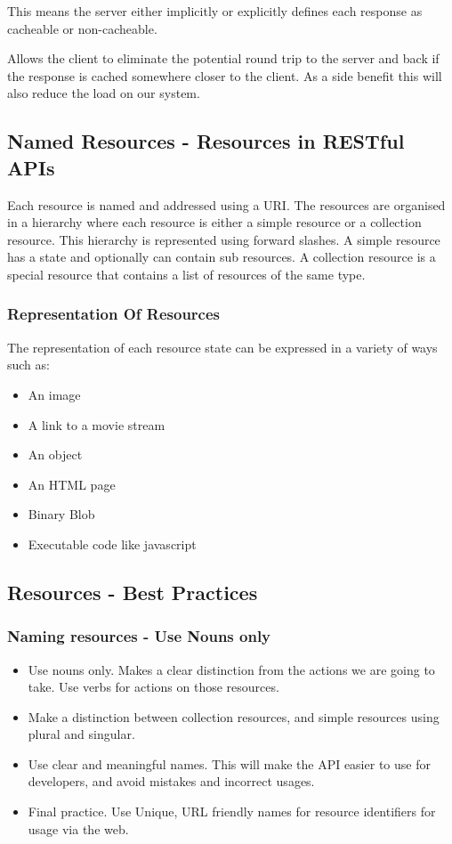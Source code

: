 This means the server either implicitly or explicitly defines each response as cacheable or non-cacheable.


Allows the client to eliminate the potential round trip to the server and back if the response is cached somewhere closer to the client.
As a side benefit this will also reduce the load on our system.

\subsection{Named Resources - Resources in RESTful APIs}

Each resource is named and addressed using a URI.
The resources are organised in a hierarchy where each resource is either a simple resource or a collection resource.
This hierarchy is represented using forward slashes.
A simple resource has a state and optionally can contain sub resources.
A collection resource is a special resource that contains a list of resources of the same type.

\subsubsection{Representation Of Resources}
The representation of each resource state can be expressed in a variety of ways such as:
\begin{itemize}
    \item An image
    \item A link to a movie stream
    \item An object
    \item An HTML page
    \item Binary Blob
    \item Executable code like javascript
\end{itemize}

\subsection{Resources - Best Practices}

\subsubsection{Naming resources - Use Nouns only}
\begin{itemize}
    \item Use nouns only. Makes a clear distinction from the actions we are going to take. Use verbs for actions on those resources.
    \item Make a distinction between collection resources, and simple resources using plural and singular.
    \item Use clear and meaningful names. This will make the API easier to use for developers, and avoid mistakes and incorrect usages.
    \item Final practice. Use Unique, URL friendly names for resource identifiers for usage via the web.
\end{itemize}

